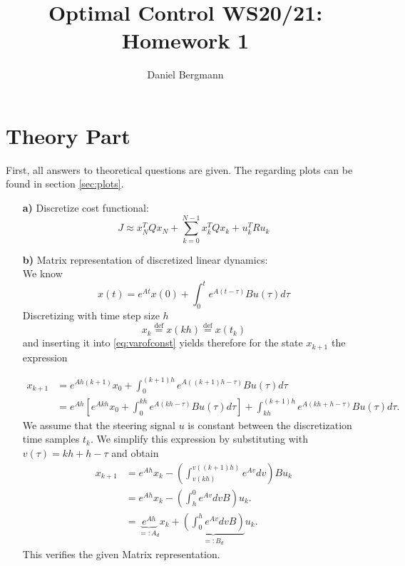 \documentclass[]{article}
\title{Optimal Control WS20/21: Homework 1}
\author{Daniel Bergmann}
\newcommand{\trp}{^T}
\newcommand{\xnull}{x_0}
\newcommand{\xN}{x_N}
\newcommand{\xk}{x_k}
\newcommand{\uk}{u_k}
\newcommand{\Ad}{A_d}
\newcommand{\Bd}{B_d}
\newcommand{\xkplus}{x_{k+1}}
\newcommand{\tk}{t_{k}}
\begin{document}
\maketitle

\section{Theory Part}
First, all answers to theoretical questions are given. The regarding plots can be found in section \ref{sec:plots}.
\begin{enumerate}
	\item[\bf a)] Discretize cost functional:\\
	 	\begin{equation}
			 J \approx  \xN\trp Q \xN + \sum_{k = 0}^{N-1} \xk \trp Q \xk + \uk\trp R \uk
	 	\end{equation}
		
	\item[\bf b)] Matrix representation of discretized linear dynamics:\\
	
	We know
	\begin{equation}
		x(t) = e^{At} x(0) + \int_{0}^{t} e^{A(t-\tau)} B u(\tau) d\tau \label{eq:varofconst}
	\end{equation}
		Discretizing  with time step size $ h $ \[ \xk \overset{\mathrm{def}}{=} x(kh) \overset{\mathrm{def}}{=} x(t_k) \] and inserting it into  \eqref{eq:varofconst} yields therefore for the state $ \xkplus $ the expression
		
		\begin{align}
			\xkplus &= e^{Ah(k+1)} \xnull + \int_{0}^{(k+1)h} e^{A((k+1)h-\tau)} Bu(\tau) d\tau\\
					&= e^{Ah}\left[ e^{Akh}\xnull + \int_{0}^{kh} e^{A(kh-\tau)}Bu(\tau) d\tau\right] + \int_{kh}^{(k+1)h} e^{A(kh+h-\tau)}Bu(\tau) d\tau.
		\end{align}
		We assume that the steering signal $ u $ is constant between the discretization time samples $ \tk. $
		We simplify this expression  by substituting with $ v(\tau) = kh + h - \tau $ and obtain
		\begin{align}
			\xkplus &= e^{Ah}\xk - \left( \int_{v(kh)}^{v((k+1)h)} e^{Av} dv \right) B\uk\\
			&= e^{Ah}\xk - \left(\int_{h}^{0} e^{Av} dv B \right) \uk.\\
					&= \underbrace{e^{Ah}}_{=:\Ad}\xk + \underbrace{\left(\int_{0}^{h} e^{Av} dv B \right)}_{=:\Bd}   \uk. \label{eq:exactdiscr}
		\end{align}
		This verifies the given Matrix representation.


\end{enumerate}
\end{document}
